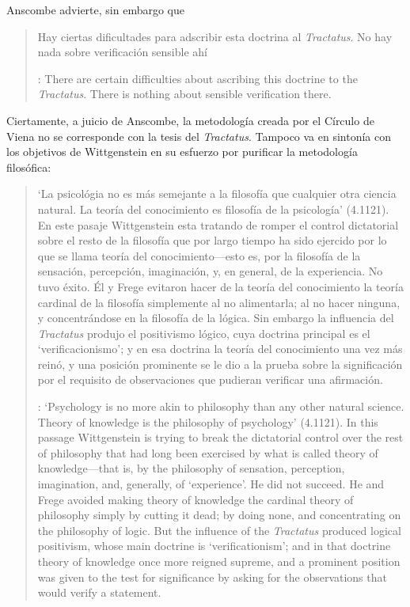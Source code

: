 Anscombe advierte, sin embargo que \blockquote[{\cite[150]{anscombe1959iwt}}:
There are certain difficulties about ascribing this doctrine to the
\emph{Tractatus}. There is nothing about sensible verification there.]{Hay
  ciertas dificultades para adscribir esta doctrina al \emph{Tractatus}. No hay
  nada sobre verificación sensible ahí}. Ciertamente, a juicio de Anscombe, la
metodología creada por el Círculo de Viena no se corresponde con la tesis del
\emph{Tractatus}. Tampoco va en sintonía con los objetivos de Wittgenstein en su
esfuerzo por purificar la metodología filosófica:
\blockquote[{\cite[152]{anscombe1959iwt}}: `Psychology is no more akin to
philosophy than any other natural science. Theory of knowledge is the philosophy
of psychology' (4.1121). In this passage Wittgenstein is trying to break the
dictatorial control over the rest of philosophy that had long been exercised by
what is called theory of knowledge---that is, by the philosophy of sensation,
perception, imagination, and, generally, of `experience'. He did not succeed. He
and Frege avoided making theory of knowledge the cardinal theory of philosophy
simply by cutting it dead; by doing none, and concentrating on the philosophy of
logic. But the influence of the \emph{Tractatus} produced logical positivism,
whose main doctrine is `verificationism'; and in that doctrine theory of
knowledge once more reigned supreme, and a prominent position was given to the
test for significance by asking for the observations that would verify a
statement.]{`La psicológia no es más semejante a la filosofía que cualquier otra
  ciencia natural. La teoría del conocimiento es filosofía de la psicología'
  (4.1121). En este pasaje Wittgenstein esta tratando de romper el control
  dictatorial sobre el resto de la filosofía que por largo tiempo ha sido
  ejercido por lo que se llama teoría del conocimiento---esto es, por la
  filosofía de la sensación, percepción, imaginación, y, en general, de la
  experiencia. No tuvo éxito. Él y Frege evitaron hacer de la teoría del
  conocimiento la teoría cardinal de la filosofía simplemente al no alimentarla;
  al no hacer ninguna, y concentrándose en la filosofía de la lógica. Sin
  embargo la influencia del \emph{Tractatus} produjo el positivismo lógico, cuya
  doctrina principal es el `verificacionismo'; y en esa doctrina la teoría del
  conocimiento una vez más reinó, y una posición prominente se le dio a la
  prueba sobre la significación por el requisito de observaciones que pudieran
  verificar una afirmación.}

